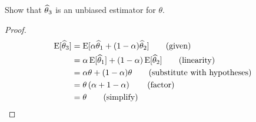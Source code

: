 Show that $\widehat{\theta}_3$ is an unbiased estimator for $\theta$.

\begin{proof}
    \begin{align*}
        \Eb*{\that_3} &= \Eb*{\alpha \that_1 + (1-\alpha)\that_2} \tag{given}\\
        &= \alpha \Eb*{\that_1} + (1-\alpha)\Eb*{\that_2} \tag{linearity}\\
        &= \alpha \theta + (1-\alpha) \theta \tag{substitute with hypotheses}\\
        &= \theta \pars{\alpha + 1 - \alpha} \tag{factor}\\
        &= \theta \tag{simplify}
    \end{align*}
\end{proof}